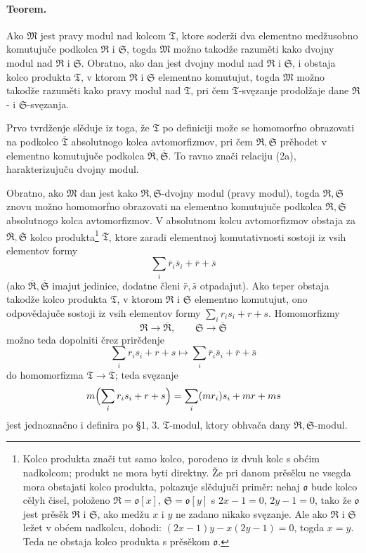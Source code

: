 \documentclass[11pt]{article}
\providecommand{\frM}{\mathfrak M}
\providecommand{\frR}{\mathfrak R}
\providecommand{\frS}{\mathfrak S}
\providecommand{\frT}{\mathfrak T}
\providecommand{\frako}{\mathfrak o}
\begin{document}
\paragraph{Teorem.}
Ako \(\frM\) jest pravy modul nad kolcom \(\frT\), ktore soderži dva elementno medžusobno komutujuče podkolca \(\frR\) i \(\frS\), togda \(\frM\) možno takodže razuměti kako dvojny modul nad \(\frR\) i \(\frS\). Obratno, ako dan jest dvojny modul nad \(\frR\) i \(\frS\), i obstaja kolco produkta \(\frT\), v ktorom \(\frR\) i \(\frS\) elementno komutujut, togda \(\frM\) možno takodže razuměti kako pravy modul nad \(\frT\), pri čem \(\frT\)-svęzanje prodolžaje dane \(\frR\)- i \(\frS\)-svęzanja.

Prvo tvrdženje slěduje iz toga, že \(\frT\) po definiciji može se homomorfno obrazovati na podkolco \(\overline{\frT}\) absolutnogo kolca avtomorfizmov, pri čem \(\frR,\frS\) prěhodet v elementno komutujuče podkolca \(\overline{\frR},\overline{\frS}\). To ravno znači relaciju (2a), harakterizujuču dvojny modul.

Obratno, ako \(\frM\) dan jest kako \(\frR,\frS\)-dvojny modul (pravy modul), togda \(\frR,\frS\) znovu možno homomorfno obrazovati na elementno komutujuče podkolca \(\overline{\frR},\overline{\frS}\) absolutnogo kolca avtomorfizmov. V absolutnom kolcu avtomorfizmov obstaja za \(\overline{\frR},\overline{\frS}\) kolco produkta\footnote{Kolco produkta znači tut samo kolco, porođeno iz dvuh kolc s obćim nadkolcom; produkt ne mora byti direktny. Že pri danom prěsěku ne vsegda mora obstajati kolco produkta, pokazuje slědujuči priměr: nehaj \(\frako\) bude kolco cělyh čisel, položeno \(\frR=\frako[x]\), \(\frS=\frako[y]\) s \(2x-1=0\), \(2y-1=0\), tako že \(\frako\) jest prěsěk \(\frR\) i \(\frS\), ako medžu \(x\) i \(y\) ne zadano nikako svęzanje. Ale ako \(\frR\) i \(\frS\) ležet v obćem nadkolcu, dohodi: \((2x-1)y-x(2y-1)=0\), togda \(x=y\). Teda ne obstaja kolco produkta s prěsěkom \(\frako\).} \(\overline{\frT}\), ktore zaradi elementnoj komutativnosti sostoji iz vsih elementov formy
\[
        \sum_i \bar r_i\bar s_i+\bar r+\bar s
\]
(ako \(\overline{\frR},\overline{\frS}\) imajut jedinice, dodatne členi \(\bar r,\bar s\) otpadajut). Ako teper obstaja takodže kolco produkta \(\frT\), v ktorom \(\frR\) i \(\frS\) elementno komutujut, ono odpovědajuče sostoji iz vsih elementov formy \(\sum_i r_i s_i+r+s\). Homomorfizmy
\[
        \frR\to\overline{\frR},\qquad \frS\to\overline{\frS}
\]
možno teda dopolniti črez prirěđenje
\[
        \sum_i r_i s_i+r+s
        \longmapsto
        \sum_i \bar r_i\bar s_i+\bar r+\bar s
\]
do homomorfizma \(\frT\to\overline{\frT}\); teda svęzanje
\[
        m\Bigl(\sum_i r_i s_i+r+s\Bigr)
        =\sum_i (m r_i)s_i+m r+m s
\]
jest jednoznačno i definira po §1, 3. \(\frT\)-modul, ktory obhvača dany \(\frR,\frS\)-modul.
\end{document}

